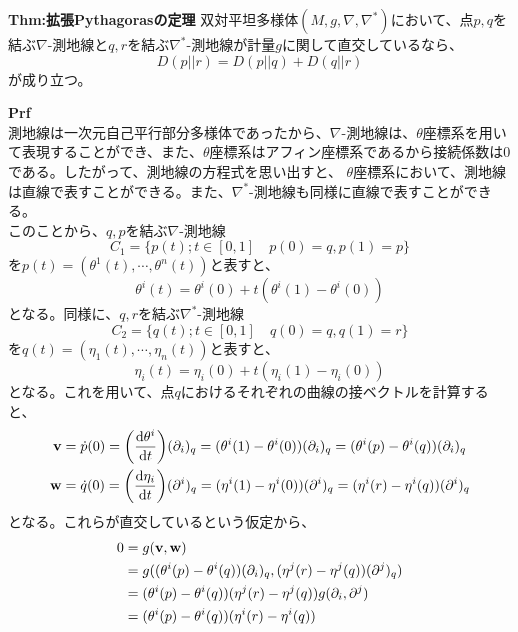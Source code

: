 \documentclass[a4paper,11pt]{jsarticle}
\numberwithin{equation}{section}
\begin{document}
    \begin{itembox}[l]{\textbf{Thm:拡張Pythagorasの定理}}
        双対平坦多様体$(M,g,\nabla,\nabla^*)$において、点$p,q$を結ぶ$\nabla$-測地線と$q,r$を結ぶ$\nabla^*$-測地線が計量$g$に関して直交しているなら、
        \begin{equation}
            D(p||r) = D(p||q) + D(q||r)
        \end{equation}
        が成り立つ。
    \end{itembox}
    \textbf{Prf}\\
    測地線は一次元自己平行部分多様体であったから、$\nabla$-測地線は、$\theta$座標系を用いて表現することができ、また、$\theta$座標系はアフィン座標系であるから接続係数は0である。したがって、測地線の方程式を思い出すと、
    $\theta$座標系において、測地線は直線で表すことができる。また、$\nabla^*$-測地線も同様に直線で表すことができる。\\
    このことから、$q,p$を結ぶ$\nabla$-測地線
    \begin{equation}
        C_1 =\{p(t) ; t \in [0,1] \quad p(0) = q, p(1) = p\}
    \end{equation}
    を$p(t)=(\theta^1(t),\cdots,\theta^n(t))$と表すと、
    \begin{equation}
        \theta^i(t) = \theta^i(0) + t(\theta^i(1) - \theta^i(0))
    \end{equation}
    となる。同様に、$q,r$を結ぶ$\nabla^*$-測地線
    \begin{equation}
        C_2 =\{q(t) ; t \in [0,1] \quad q(0) = q, q(1) = r\}
    \end{equation}
    を$q(t)=(\eta_1(t),\cdots,\eta_n(t))$と表すと、
    \begin{equation}
        \eta_i(t) = \eta_i(0) + t(\eta_i(1) - \eta_i(0))
    \end{equation}
    となる。これを用いて、点$q$におけるそれぞれの曲線の接ベクトルを計算すると、
    \begin{align}
        \vb{v} &= \dot{p}(0) = \qty(\dv{\theta^i}{t}(0))(\partial_i)_q = (\theta^i(1) - \theta^i(0))(\partial_i)_q =(\theta^i(p) - \theta^i(q))(\partial_i)_q\\
        \vb{w} &= \dot{q}(0) = \qty(\dv{\eta_i}{t}(0))(\partial^i)_q = (\eta^i(1) - \eta^i(0))(\partial^i)_q =(\eta^i(r) - \eta^i(q))(\partial^i)_q
    \end{align}
    となる。これらが直交しているという仮定から、
    \begin{align}
        0 &= g(\vb{v},\vb{w}) \\
        &= g((\theta^i(p) - \theta^i(q))(\partial_i)_q,(\eta^j(r) - \eta^j(q))(\partial^j)_q) \\
        &= (\theta^i(p) - \theta^i(q))(\eta^j(r) - \eta^j(q))g(\partial_i,\partial^j) \\
        &= (\theta^i(p) - \theta^i(q))(\eta^i(r) - \eta^i(q))
    \end{align}
\end{document}
